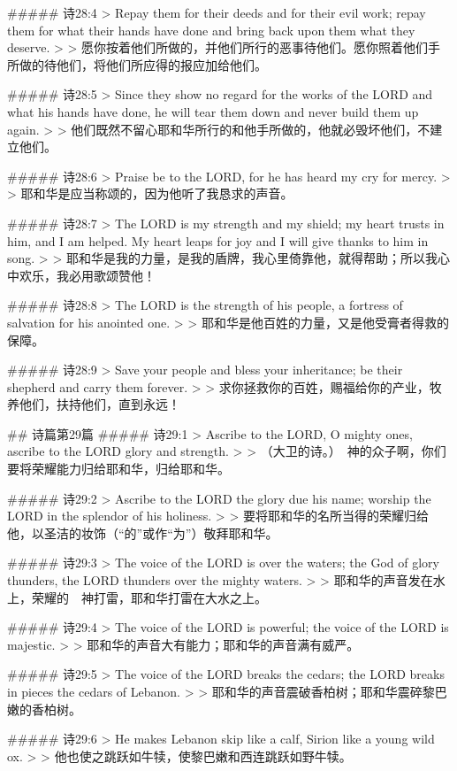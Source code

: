 ##### 诗28:4
> Repay them for their deeds and for their evil work; repay them for what their hands have done and bring back upon them what they deserve.
>
> 愿你按着他们所做的，并他们所行的恶事待他们。愿你照着他们手所做的待他们，将他们所应得的报应加给他们。


##### 诗28:5
> Since they show no regard for the works of the LORD and what his hands have done, he will tear them down and never build them up again.
>
> 他们既然不留心耶和华所行的和他手所做的，他就必毁坏他们，不建立他们。


##### 诗28:6
> Praise be to the LORD, for he has heard my cry for mercy.
>
> 耶和华是应当称颂的，因为他听了我恳求的声音。


##### 诗28:7
> The LORD is my strength and my shield; my heart trusts in him, and I am helped. My heart leaps for joy and I will give thanks to him in song.
>
> 耶和华是我的力量，是我的盾牌，我心里倚靠他，就得帮助；所以我心中欢乐，我必用歌颂赞他！


##### 诗28:8
> The LORD is the strength of his people, a fortress of salvation for his anointed one.
>
> 耶和华是他百姓的力量，又是他受膏者得救的保障。


##### 诗28:9
> Save your people and bless your inheritance; be their shepherd and carry them forever.
>
> 求你拯救你的百姓，赐福给你的产业，牧养他们，扶持他们，直到永远！


## 诗篇第29篇
##### 诗29:1
> Ascribe to the LORD, O mighty ones, ascribe to the LORD glory and strength.
>
> （大卫的诗。）　神的众子啊，你们要将荣耀能力归给耶和华，归给耶和华。


##### 诗29:2
> Ascribe to the LORD the glory due his name; worship the LORD in the splendor of his holiness.
>
> 要将耶和华的名所当得的荣耀归给他，以圣洁的妆饰（“的”或作“为”）敬拜耶和华。


##### 诗29:3
> The voice of the LORD is over the waters; the God of glory thunders, the LORD thunders over the mighty waters.
>
> 耶和华的声音发在水上，荣耀的　神打雷，耶和华打雷在大水之上。


##### 诗29:4
> The voice of the LORD is powerful; the voice of the LORD is majestic.
>
> 耶和华的声音大有能力；耶和华的声音满有威严。


##### 诗29:5
> The voice of the LORD breaks the cedars; the LORD breaks in pieces the cedars of Lebanon.
>
> 耶和华的声音震破香柏树；耶和华震碎黎巴嫩的香柏树。


##### 诗29:6
> He makes Lebanon skip like a calf, Sirion like a young wild ox.
>
> 他也使之跳跃如牛犊，使黎巴嫩和西连跳跃如野牛犊。


